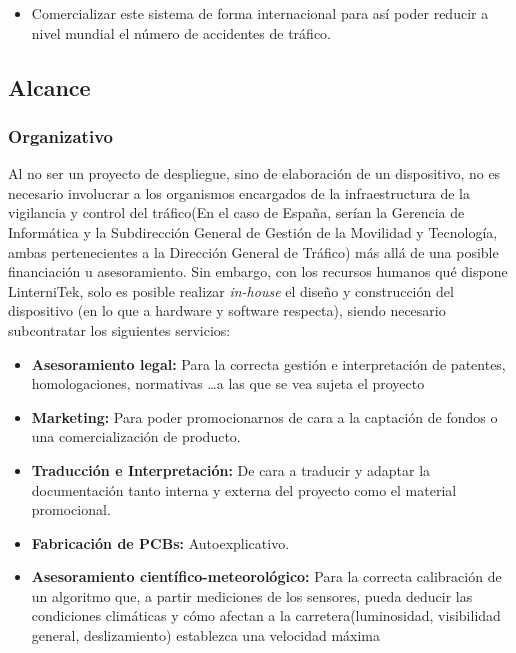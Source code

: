 \documentclass[
	a4paper, %
	12pt, %
]{CSSullivanBusinessReport}
\begin{document}
\begin{fullwidth}
\begin{itemize}
    \item  Comercializar este sistema de forma internacional para así poder reducir a nivel mundial el número de accidentes de tráfico. 
\end{itemize}



\subsection{Alcance}
\subsubsection{Organizativo}
Al no ser un proyecto de despliegue, sino de elaboración de un dispositivo, no es necesario involucrar a los organismos encargados de la infraestructura de la vigilancia y control del tráfico(En el caso de España, serían la Gerencia de Informática y la Subdirección General de Gestión de la Movilidad y Tecnología, ambas pertenecientes a la Dirección General de Tráfico) más allá de una posible financiación u asesoramiento. Sin embargo, con los recursos humanos qué dispone LinterniTek, solo es posible realizar \textit{in-house} el diseño y construcción del dispositivo (en lo que a hardware y software respecta), siendo necesario  subcontratar los siguientes servicios: 
\begin{itemize}
    \item \textbf{Asesoramiento legal:} Para la correcta gestión e interpretación de patentes, homologaciones, normativas \ldots a las que se vea sujeta el proyecto
    \item \textbf{Marketing:} Para poder promocionarnos de cara a la captación de fondos o una comercialización de producto.
    \item \textbf{Traducción e Interpretación:} De cara a traducir y adaptar la documentación tanto interna y externa del proyecto como el material promocional.
    \item \textbf{Fabricación de PCBs:} Autoexplicativo.
     \item \textbf{Asesoramiento científico-meteorológico:} Para la correcta calibración de un algoritmo que, a partir mediciones de los sensores, pueda deducir las condiciones climáticas y cómo afectan a la carretera(luminosidad, visibilidad general, deslizamiento) establezca una velocidad máxima
\end{itemize}


\end{fullwidth}
\end{document}
